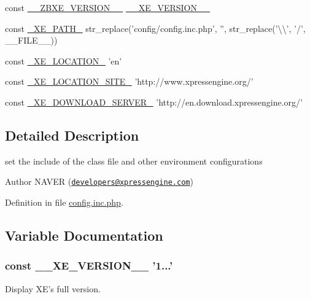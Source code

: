 \begin{DoxyCompactItemize}
\item 
const \hyperlink{config_8inc_8php_a0e70c145bf3712e075af5c3861045dc9}{\+\_\+\+\_\+\+Z\+B\+X\+E\+\_\+\+V\+E\+R\+S\+I\+O\+N\+\_\+\+\_\+} \hyperlink{config_8inc_8php_afceaaec30d0e5b6a78d0ae28bcbfc8f3}{\+\_\+\+\_\+\+X\+E\+\_\+\+V\+E\+R\+S\+I\+O\+N\+\_\+\+\_\+}
\item 
const \hyperlink{config_8inc_8php_a5387c7a3f2aa38adf16f324cee88db88}{\+\_\+\+X\+E\+\_\+\+P\+A\+T\+H\+\_\+} str\+\_\+replace('config/config.\+inc.\+php', '', str\+\_\+replace('\textbackslash{}\textbackslash{}', '/', \+\_\+\+\_\+\+F\+I\+L\+E\+\_\+\+\_\+))
\item 
const \hyperlink{config_8inc_8php_a7330debbfb3a027cdd5f3d3dd1dfbdd0}{\+\_\+\+X\+E\+\_\+\+L\+O\+C\+A\+T\+I\+O\+N\+\_\+} 'en'
\item 
const \hyperlink{config_8inc_8php_a063bfd2eb9f811b1676d0dbc0cad2648}{\+\_\+\+X\+E\+\_\+\+L\+O\+C\+A\+T\+I\+O\+N\+\_\+\+S\+I\+T\+E\+\_\+} 'http\+://www.\+xpressengine.\+org/'
\item 
const \hyperlink{config_8inc_8php_a22df32d3e0eae0d60d6cddb9ec99d5ec}{\+\_\+\+X\+E\+\_\+\+D\+O\+W\+N\+L\+O\+A\+D\+\_\+\+S\+E\+R\+V\+E\+R\+\_\+} 'http\+://en.\+download.\+xpressengine.\+org/'
\end{DoxyCompactItemize}


\subsection{Detailed Description}
set the include of the class file and other environment configurations

\begin{DoxyAuthor}{Author}
N\+A\+V\+E\+R (\href{mailto:developers@xpressengine.com}{\tt developers@xpressengine.\+com}) 
\end{DoxyAuthor}


Definition in file \hyperlink{config_8inc_8php_source}{config.\+inc.\+php}.



\subsection{Variable Documentation}
\hypertarget{config_8inc_8php_afceaaec30d0e5b6a78d0ae28bcbfc8f3}{
\subsubsection[{\+\_\+\+\_\+\+X\+E\+\_\+\+V\+E\+R\+S\+I\+O\+N\+\_\+\+\_\+}]{\setlength{\rightskip}{0pt plus 5cm}const \+\_\+\+\_\+\+X\+E\+\_\+\+V\+E\+R\+S\+I\+O\+N\+\_\+\+\_\+ '1...'}}\label{config_8inc_8php_afceaaec30d0e5b6a78d0ae28bcbfc8f3}
Display X\+E's full version. 


